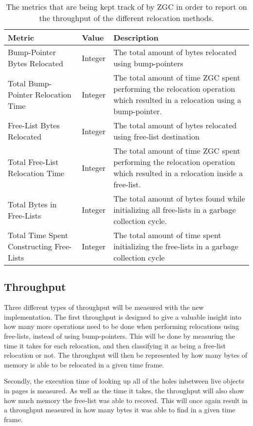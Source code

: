 \begin{table}[H]
  \centering
  \begin{tabular}{|p{4cm}|l|p{6cm}|}
    \hline
    Metric & Value & Description \\ \hline
    Bump-Pointer Bytes Relocated & Integer & The total amount of bytes relocated using bump-pointers \\ \hline
    Total Bump-Pointer Relocation Time & Integer & The total amount of time ZGC spent performing the relocation operation which resulted in a relocation using a bump-pointer. \\ \hline
    Free-List Bytes Relocated & Integer & The total amount of bytes relocated using free-list destination \\ \hline
    Total Free-List Relocation Time & Integer & The total amount of time ZGC spent performing the relocation operation which resulted in a relocation inside a free-list. \\ \hline
    Total Bytes in Free-Lists & Integer & The total amount of bytes found while initializing all free-lists in a garbage collection cycle. \\ \hline
    Total Time Spent Constructing Free-Lists &  Integer & The total amount of time spent initializing the free-lists in a garbage collection cycle \\ \hline
  \end{tabular}
  \caption{The metrics that are being kept track of by ZGC in order to report on the throughput of the different relocation methods.}
  \label{table:gc_logs_throughput}
\end{table}

\subsection{Throughput}
Three different types of throughput will be measured with the new implementation. The first throughput is designed to give a valuable insight into how many more operations need to be done when performing relocations using free-lists, instead of using bump-pointers. This will be done by measuring the time it takes for each relocation, and then classifying it as being a free-list relocation or not. The throughput will then be represented by how many bytes of memory is able to be relocated in a given time frame.

Secondly, the execution time of looking up all of the holes inbetween live objects in pages is measured. As well as the time it takes, the throughput will also show how much memory the free-list was able to recoved. This will once again result in a throughput measured in how many bytes it was able to find in a given time frame.

